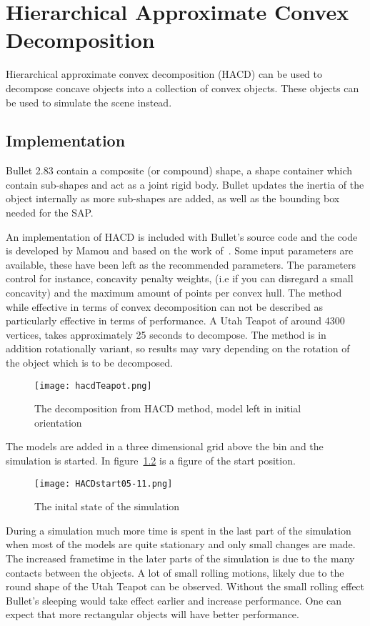 \chapter{Hierarchical Approximate Convex Decomposition}\label{sec:hacd}
Hierarchical approximate convex decomposition (HACD) can be used to decompose
concave objects into a collection of convex objects. These objects can be used
to simulate the scene instead.
\section{Implementation}
Bullet 2.83 contain a
composite (or compound) shape, a shape container which contain sub-shapes and act
as a joint rigid body. Bullet updates the inertia of the object internally as
more sub-shapes are added, as well as the bounding box needed for the SAP.

An implementation of HACD is included with Bullet's source code and the code is
developed by Mamou and based on the work of~\cite{mamou}. Some input parameters are available, these have been
left as the recommended parameters. The parameters control for instance, concavity
penalty weights, (i.e if you can disregard a small concavity)
and the maximum amount of points per convex hull.
The method while effective in terms of convex decomposition can not be described as
particularly effective in terms of performance. A Utah Teapot of around 4300 vertices,
takes approximately 25 seconds to decompose. The method is in addition rotationally
 variant, so results may vary depending on the rotation of the object which is to be decomposed.

 \begin{figure}[H]
   \centering
   \texttt{[image: hacdTeapot.png]}
   \caption{The decomposition from HACD method, model left in initial orientation}
   \label{fig:HACD}
 \end{figure}

The models are added in a three dimensional grid above the bin and the simulation
is started. In figure~\ref{fig:hacdStart} is a figure of the start position.

\begin{figure}[H]
  \centering
  \texttt{[image: HACDstart05-11.png]}
  \caption{The inital state of the simulation}
  \label{fig:hacdStart}
\end{figure}

During a simulation much more time is spent in the last
part of the simulation when most of the models are quite stationary and only small
changes are made. The increased frametime in the later parts of the simulation is
due to the many contacts between the objects. A lot of small rolling motions, likely due to the round
shape of the Utah Teapot can be observed. Without the small rolling effect Bullet's
sleeping would take effect earlier and increase performance. One can expect that
more rectangular objects will have better performance.


